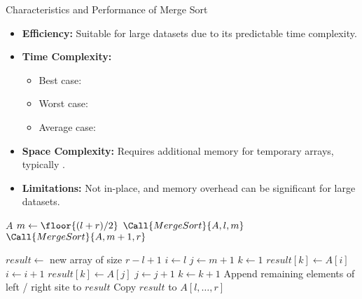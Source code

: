 \begin{properties}[]{Characteristics and Performance of Merge Sort}
\begin{itemize}
    \item \textbf{Efficiency:} Suitable for large datasets due to its predictable time complexity.
    \item \textbf{Time Complexity:}
    \begin{itemize}
        \item Best case: 
        \item Worst case: 
        \item Average case: 
    \end{itemize}
    \item \textbf{Space Complexity:} Requires additional memory for temporary arrays, typically .
    \item \textbf{Limitations:} Not in-place, and memory overhead can be significant for large datasets.
\end{itemize}
\end{properties}

\begin{algorithm}
    \begin{spacing}{1.2}
        \caption{Merge Sort}
        \begin{algorithmic}[1]
                    \State \Return $A$ 
                \EndIf
                \State $m \gets \floor{(l + r)/2}$
                \State $\Call{MergeSort}{A, l, m}$ 
                \State $\Call{MergeSort}{A, m + 1, r}$ 
                \State {}
            \EndProcedure

             
                \State $result \gets$ new array of size $r - l + 1$
                \State $i \gets l$
                \State $j \gets m + 1$
                \State $k \gets 1$
                        \State $result[k] \gets A[i]$
                        \State $i \gets i + 1$
                    \Else
                        \State $result[k] \gets A[j]$
                        \State $j \gets j + 1$
                    \EndIf
                    \State $k \gets k + 1$
                \EndWhile
                \State Append remaining elements of left / right site to $result$
                \State Copy $result$ to $A[l, \ldots, r]$
            \EndProcedure
        \end{algorithmic}
    \end{spacing}
\end{algorithm}

